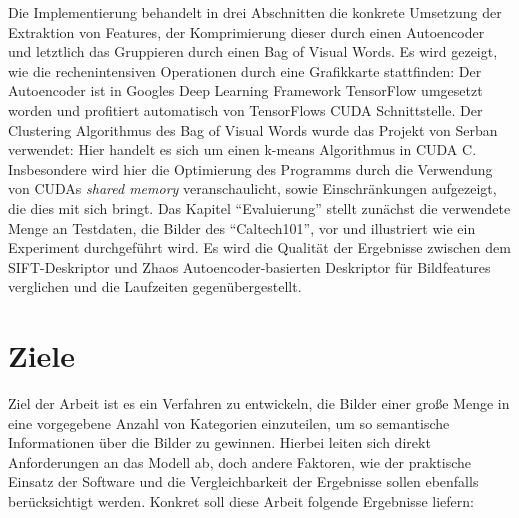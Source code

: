 Die Implementierung behandelt in drei Abschnitten die konkrete Umsetzung der Extraktion von Features, der Komprimierung dieser durch einen Autoencoder und letztlich das Gruppieren durch einen Bag of Visual Words. Es wird gezeigt, wie die  rechenintensiven Operationen durch eine Grafikkarte stattfinden: Der Autoencoder ist in Googles Deep Learning Framework TensorFlow umgesetzt worden und profitiert automatisch von TensorFlows CUDA Schnittstelle. Der Clustering Algorithmus des Bag of Visual Words wurde das Projekt von Serban verwendet: Hier handelt es sich um einen k-means Algorithmus in CUDA C. Insbesondere wird hier die Optimierung des Programms durch die Verwendung von CUDAs \textit{shared memory} veranschaulicht, sowie Einschränkungen aufgezeigt, die dies mit sich bringt.\newline
Das Kapitel \enquote{Evaluierung} stellt zunächst die verwendete Menge an Testdaten, die Bilder des \enquote{Caltech101}, vor und illustriert wie ein Experiment durchgeführt wird. Es wird die Qualität der Ergebnisse zwischen dem SIFT-Deskriptor und Zhaos Autoencoder-basierten Deskriptor für Bildfeatures verglichen und die Laufzeiten gegenübergestellt.


\section{Ziele}

Ziel der Arbeit ist es ein Verfahren zu entwickeln, die Bilder einer große Menge in eine vorgegebene Anzahl von Kategorien einzuteilen, um so semantische Informationen über die Bilder zu gewinnen. Hierbei leiten sich direkt Anforderungen an das Modell ab, doch andere Faktoren, wie der praktische Einsatz der Software und die Vergleichbarkeit der Ergebnisse sollen ebenfalls berücksichtigt werden. Konkret soll diese Arbeit folgende Ergebnisse liefern:

